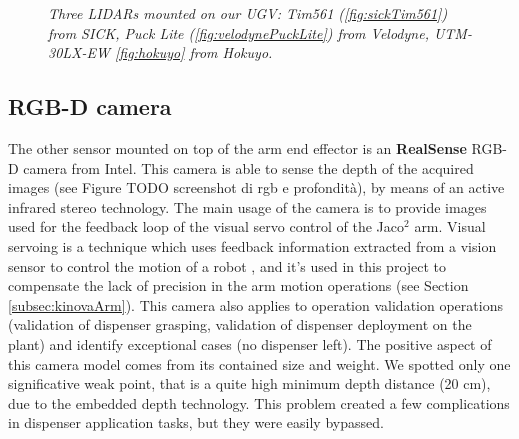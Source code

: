 \begin{figure}
	\centering
	\caption{\textit{Three \ac{LIDAR}s mounted on our \ac{UGV}: Tim561 (\ref{fig:sickTim561}) from SICK, Puck Lite (\ref{fig:velodynePuckLite}) from Velodyne, UTM-30LX-EW \ref{fig:hokuyo} from Hokuyo.}}
\end{figure}

\subsection{RGB-D camera}
The other sensor mounted on top of the arm end effector is an \textbf{RealSense} RGB-D camera from Intel. This camera is able to sense the depth of the acquired images (see Figure TODO screenshot di rgb e profondità), by means of an active infrared stereo technology. The main usage of the camera is to provide images used for the feedback loop of the visual servo control of the Jaco$^2$ arm. Visual servoing is a technique which uses feedback information extracted from a vision sensor to control the motion of a robot \parencite{visualServo}, and it's used in this project to compensate the lack of precision in the arm motion operations (see Section \ref{subsec:kinovaArm}). This camera also applies to operation validation operations (validation of dispenser grasping, validation of dispenser deployment on the plant) and identify exceptional cases (no dispenser left). The positive aspect of this camera model comes from its contained size and weight. We spotted only one significative weak point, that is a quite high minimum depth distance (20 cm), due to the embedded depth technology. This problem created a few complications in dispenser application tasks, but they were easily bypassed.

